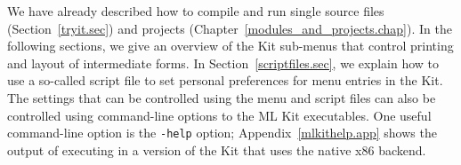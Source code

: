 \documentclass[12pt]{book}
\begin{document}
We have already described how to compile and run single source files
(Section~\ref{tryit.sec}) and projects
(Chapter~\ref{modules_and_projects.chap}).  In the following sections,
we give an overview of the Kit sub-menus that control printing and
layout of intermediate forms. In Section~\ref{scriptfiles.sec}, we
explain how to use a so-called script file to set personal preferences
for menu entries in the Kit. The settings that can be controlled using
the menu and script files can also be controlled using command-line
options to the ML Kit executables. One useful command-line option is
the 
%
{\tt -help} option; Appendix~\ref{mlkithelp.app} shows the output of
executing  in a version of the Kit that uses the
native x86 backend.



\end{document}
